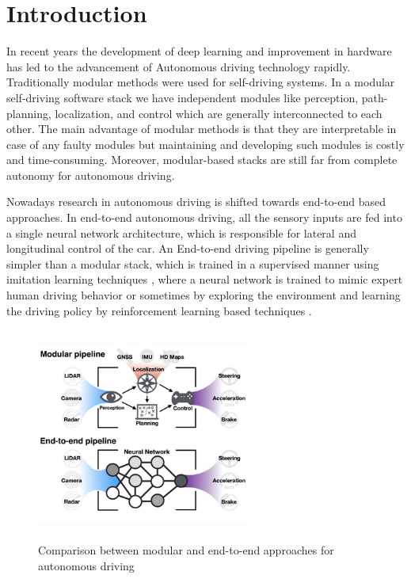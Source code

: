 

    \chapter{Introduction}
    In recent years the development of deep learning and improvement in hardware has led to the advancement of Autonomous driving technology rapidly. Traditionally modular methods were used for self-driving systems. In a modular self-driving software stack we have independent modules like perception, path-planning, localization, and control which are generally interconnected to each other. The main advantage of modular methods is that they are interpretable in case of any faulty modules but maintaining and developing such modules is costly and time-consuming. Moreover, modular-based stacks are still far from complete autonomy for autonomous driving.
    \par Nowadays research in autonomous driving is shifted towards end-to-end based approaches. In end-to-end autonomous driving, all the sensory inputs are fed into a single neural network architecture, which is responsible for lateral and longitudinal control of the car.  An End-to-end driving pipeline is generally simpler than a modular stack, which is trained in a supervised manner using imitation learning techniques \cite{DBLP:journals/corr/abs-1710-02410}, \cite{pan2019agile} where a neural network is trained to mimic expert human driving behavior or sometimes by exploring the environment and learning the driving policy by reinforcement learning based techniques \cite{DBLP:journals/corr/abs-1807-00412}.  

     \begin{figure}[h]
    \centering
    \includegraphics[width=7cm, height=7cm]{images/Modularvsend.png}
    \caption{Comparison between modular and end-to-end approaches for autonomous driving \cite{DBLP:journals/corr/abs-2003-06404}}
    \end{figure}
    

